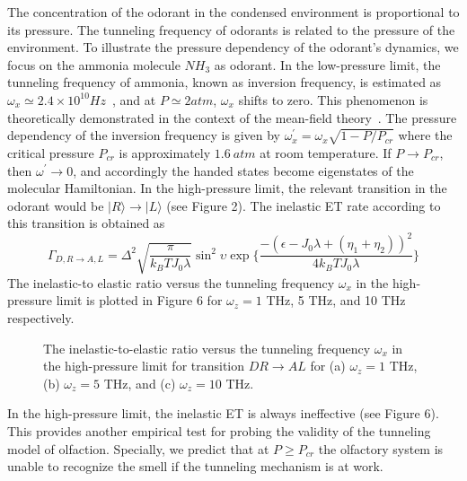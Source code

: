 \documentclass[aps,prl,tightenlines,onecolumn,superscriptaddress]{revtex4}
\begin{document}
 The concentration of the odorant in the condensed environment is proportional to its pressure. The tunneling frequency of odorants is related to the pressure of the environment. To illustrate the pressure dependency of the odorant's dynamics, we focus on the ammonia molecule $NH_{3}$ as odorant. In the low-pressure limit, the tunneling frequency of ammonia, known as inversion frequency, is estimated as $\omega_{x}\simeq 2.4\times10^{10}Hz$~\cite{Ble}, and at $P\simeq 2atm$, $\omega_{x}$ shifts to zero. This phenomenon is theoretically demonstrated in the context of the mean-field theory~\cite{Jon}. The pressure dependency of the inversion frequency is given by $\omega_{x}^{\prime}=\omega_{x}\sqrt{1-P/P_{cr}}$ where the critical pressure $P_{cr}$ is approximately $1.6~atm$ at room temperature. If $P\rightarrow P_{cr}$, then $\omega^{\prime}\rightarrow0$, and accordingly the handed states become eigenstates of the molecular Hamiltonian. In the high-pressure limit, the relevant transition in the odorant would be $|R\rangle\rightarrow|L\rangle$ (see Figure 2). The inelastic ET rate according to this transition is obtained as
\begin{equation}\label{LR}
\Gamma_{{D,R\rightarrow A,L}}=\Delta^{2}\sqrt{\frac{\pi}{k_{B}TJ_{0}\lambda}}\sin^{2}\upsilon\exp\Big\{ \frac{-(\epsilon-J_{0}\lambda+(\eta_{1}+\eta_{2}))^{2}}{4k_{B}TJ_{0}\lambda}\Big\}
\end{equation}
The inelastic-to elastic ratio versus the tunneling frequency $\omega_{x}$ in the high-pressure limit is plotted in Figure 6 for $\omega_{z}=1$ THz, 5 THz, and 10 THz respectively.

\begin{figure}[H]
\centering
{}\centering
{}\centering
\caption{The inelastic-to-elastic ratio versus the tunneling frequency $\omega_{x}$ in the high-pressure limit for transition $DR\rightarrow AL$ for (a) $\omega_{z}=1$ THz, (b) $\omega_{z}=5$ THz, and (c) $\omega_{z}=10$ THz.}
\end{figure}

\noindent In the high-pressure limit, the inelastic ET is always ineffective (see Figure 6). This provides another empirical test for probing the validity of the tunneling model of olfaction. Specially, we predict that at $P\geq P_{cr}$ the olfactory system is unable to recognize the smell if the tunneling mechanism is at work.\\
\end{document}

